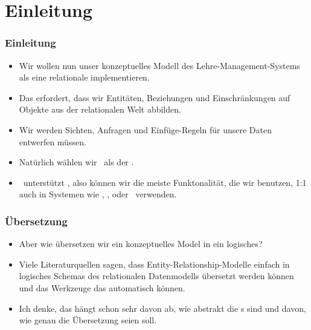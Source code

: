 \documentclass[aspectratio=169,mathserif,notheorems]{beamer}%
\subtitle{36.~Logisches Schema:~Entitäten zu Tabellen}%
\begin{document}
%
%
\startPresentation%
%
\section{Einleitung}%
%
\begin{frame}%
\frametitle{Einleitung}%
\begin{itemize}%
\item Wir wollen nun unser konzeptuelles Modell des Lehre-Management-Systems als eine relationale  implementieren.%
%
\item<2-> Das erfordert, dass wir Entitäten, Beziehungen und Einschränkungen auf Objekte aus der relationalen Welt abbilden.%
%
\item<3-> Wir werden Sichten, Anfragen und Einfüge-Regeln für unsere Daten entwerfen müssen.%
%
\item<4-> Natürlich wählen wir \postgresql\ als der .%
%
\item<5-> \postgresql\ unterstützt , also können wir die meiste Funktonalität, die wir benutzen, 1:1 auch in Systemen wie \mysql, \mariadb, oder \sqlite\ verwenden.%
%
\end{itemize}%
\end{frame}%
%
\begin{frame}%
\frametitle{Übersetzung}%
\begin{itemize}%
\item Aber wie übersetzen wir ein konzeptuelles Model in ein logisches?%
%
\item<2-> Viele Literaturquellen sagen, dass Entity-Relationship-Modelle einfach in logisches Schemas des relationalen Datenmodells übersetzt werden können und das Werkzeuge das automatisch können\cite{SS2005EIDDDFDB:SDLDUTRDM}.%
%
\item<3-> Ich denke, das hängt schon sehr davon ab, wie abstrakt die s sind \alert{und} davon, wie genau die Übersetzung seien soll.%
%
\end{itemize}%
\end{frame}%
%
\end{document}
